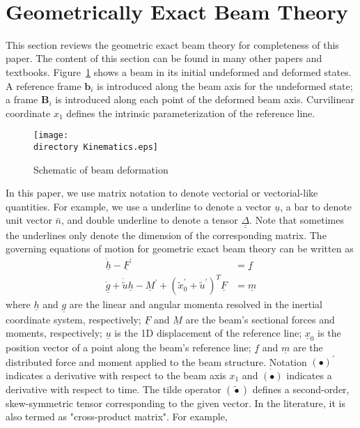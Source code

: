 \documentclass{aiaa-tc}
\def\directory{EPSF/}
\renewcommand{\vec}[1]{\underline{#1}}
\renewcommand{\skew}[1]{\widetilde{#1}}
\begin{document}
~

\section{Geometrically Exact Beam Theory}

This section reviews the geometric exact beam theory for completeness of this paper. The content of this section can be found in many other papers and textbooks.
Figure~\ref{Kinematics} shows a beam in its initial undeformed
and deformed states. A reference frame $\mathbf{b}_i$ is introduced along the
beam axis for the undeformed state; a frame $\mathbf{B}_i$ is introduced
along each point of the deformed beam axis. Curvilinear coordinate $x_1$ defines the intrinsic parameterization of the reference line.
\begin{figure}
\centering
\texttt{[image: \\directory Kinematics.eps]}
\caption{Schematic of beam deformation} \label{Kinematics}
\end{figure}
In this paper, we use matrix notation to denote vectorial or vectorial-like quantities. For example, we use a underline to denote a vector $\underline{u}$, a bar to denote unit vector $\bar{n}$, and double underline to denote a tensor $\underline{\underline{\Delta}}$. Note that sometimes the underlines only denote the dimension of the corresponding matrix. The governing equations of motion for geometric exact beam theory can be written as \cite{Bauchau:2010}
\begin{align}
	\label{GovernGEBT-1}
	\dot{\underline{h}} - \underline{F}^\prime &= \underline{f} \\
	\label{GovernGEBT-2}
	\dot{\underline{g}} + \dot{\tilde{u}} \underline{h} - \underline{M}^\prime + (\tilde{x}_0^\prime + \tilde{u}^\prime)^T \underline{F} &= \underline{m}
\end{align}
where $\vec{h}$ and $\vec{g}$ are the linear and angular momenta resolved in the inertial coordinate system, respectively; $\vec{F}$ and $\vec{M}$ are the beam's sectional forces and moments, respectively; $\vec{u}$ is the 1D displacement of the reference line; $\vec{x}_0$ is the position vector of a point along the beam's reference line; $\vec{f}$ and $\vec{m}$ are the distributed force and moment applied to the beam structure.  Notation $(\bullet)^\prime$ indicates a derivative with respect to the beam axis $x_1$ and $\dot{(\bullet)}$ indicates a derivative with respect to time. The tilde operator $(\skew{\bullet})$ defines a second-order, skew-symmetric tensor corresponding to the given vector. In the literature, it is also termed as "cross-product matrix". For example,
\end{document}
